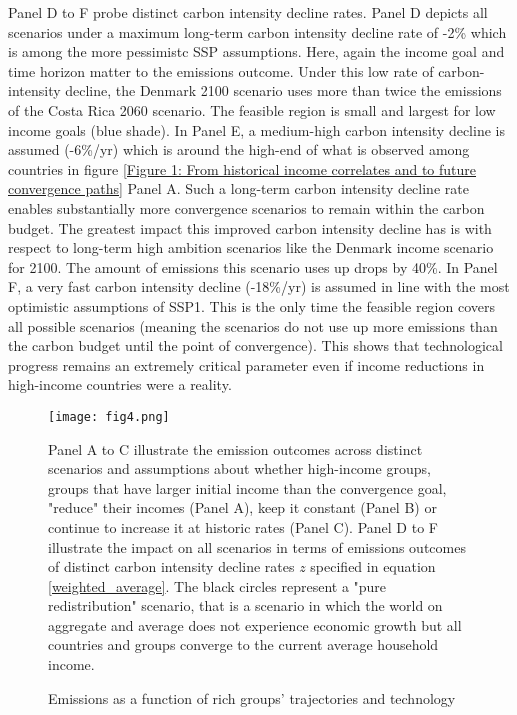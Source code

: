 \documentclass{article}
\begin{document}
Panel D to F probe distinct carbon intensity decline rates. Panel D depicts all scenarios under a maximum long-term carbon intensity decline rate of -2\% which is among the more pessimistc SSP assumptions. Here, again the income goal and time horizon matter to the emissions outcome. Under this low rate of carbon-intensity decline, the Denmark 2100 scenario uses more than twice the emissions of the Costa Rica 2060 scenario. The feasible region is small and largest for low income goals (blue shade). In Panel E, a medium-high carbon intensity decline is assumed (-6\%/yr) which is around the high-end of what is observed among countries in figure \ref{Figure 1: From historical income correlates and to future convergence paths} Panel A. Such a long-term carbon intensity decline rate enables substantially more convergence scenarios to remain within the carbon budget. The greatest impact this improved carbon intensity decline has is with respect to long-term high ambition scenarios like the Denmark income scenario for 2100. The amount of emissions this scenario uses up drops by 40\%. In Panel F, a very fast carbon intensity decline (-18\%/yr) is assumed in line with the most optimistic assumptions of SSP1. This is the only time the feasible region covers all possible scenarios (meaning the scenarios do not use up more emissions than the carbon budget until the point of convergence). This shows that technological progress remains an extremely critical parameter even if income reductions in high-income countries were a reality.

\begin{figure}[hbt!]
\centering
 \texttt{[image: fig4.png]}
  \caption{Emissions as a function of rich groups' trajectories and technology}
  \label{Figure 4: Emissions as a function of rich groups' trajectories and technology}
  \medskip
\small Panel A to C illustrate the emission outcomes across distinct scenarios and assumptions about whether high-income groups, groups that have larger initial income than the convergence goal, "reduce" their incomes (Panel A), keep it constant (Panel B) or continue to increase it at historic rates (Panel C). Panel D to F illustrate the impact on all scenarios in terms of emissions outcomes of distinct carbon intensity decline rates \(z\) specified in equation \ref{weighted_average}. The black circles represent a "pure redistribution" scenario, that is a scenario in which the world on aggregate and average does not experience economic growth but all countries and groups converge to the current average household income.
\end{figure}
\end{document}
